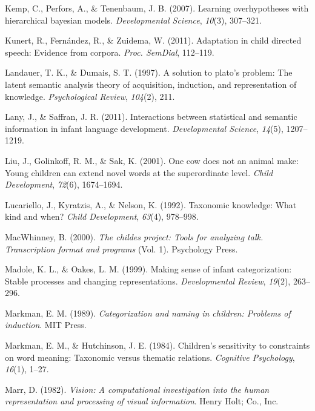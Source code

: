 \documentclass[english,,man]{apa6}
\begin{document}
\leavevmode\hypertarget{ref-kemp2007learning}{}%
Kemp, C., Perfors, A., \& Tenenbaum, J. B. (2007). Learning overhypotheses with hierarchical bayesian models. \emph{Developmental Science}, \emph{10}(3), 307--321.

\leavevmode\hypertarget{ref-kunert2011adaptation}{}%
Kunert, R., Fernández, R., \& Zuidema, W. (2011). Adaptation in child directed speech: Evidence from corpora. \emph{Proc. SemDial}, 112--119.

\leavevmode\hypertarget{ref-landauer1997solution}{}%
Landauer, T. K., \& Dumais, S. T. (1997). A solution to plato's problem: The latent semantic analysis theory of acquisition, induction, and representation of knowledge. \emph{Psychological Review}, \emph{104}(2), 211.

\leavevmode\hypertarget{ref-lany2011}{}%
Lany, J., \& Saffran, J. R. (2011). Interactions between statistical and semantic information in infant language development. \emph{Developmental Science}, \emph{14}(5), 1207--1219.

\leavevmode\hypertarget{ref-liu2001}{}%
Liu, J., Golinkoff, R. M., \& Sak, K. (2001). One cow does not an animal make: Young children can extend novel words at the superordinate level. \emph{Child Development}, \emph{72}(6), 1674--1694.

\leavevmode\hypertarget{ref-lucariello1992taxonomic}{}%
Lucariello, J., Kyratzis, A., \& Nelson, K. (1992). Taxonomic knowledge: What kind and when? \emph{Child Development}, \emph{63}(4), 978--998.

\leavevmode\hypertarget{ref-macwhinney2000}{}%
MacWhinney, B. (2000). \emph{The childes project: Tools for analyzing talk. Transcription format and programs} (Vol. 1). Psychology Press.

\leavevmode\hypertarget{ref-madole1999}{}%
Madole, K. L., \& Oakes, L. M. (1999). Making sense of infant categorization: Stable processes and changing representations. \emph{Developmental Review}, \emph{19}(2), 263--296.

\leavevmode\hypertarget{ref-markman1989}{}%
Markman, E. M. (1989). \emph{Categorization and naming in children: Problems of induction}. MIT Press.

\leavevmode\hypertarget{ref-markman1984children}{}%
Markman, E. M., \& Hutchinson, J. E. (1984). Children's sensitivity to constraints on word meaning: Taxonomic versus thematic relations. \emph{Cognitive Psychology}, \emph{16}(1), 1--27.

\leavevmode\hypertarget{ref-marr1982}{}%
Marr, D. (1982). \emph{Vision: A computational investigation into the human representation and processing of visual information}. Henry Holt; Co., Inc.
\end{document}
